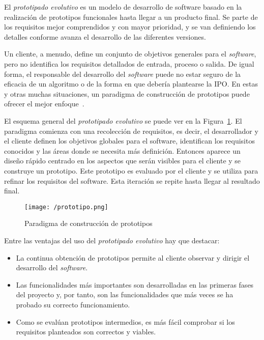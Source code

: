 El \emph{prototipado evolutivo} es un modelo de desarrollo de software basado en la realización de
prototipos funcionales hasta llegar a un producto final. Se parte de los requisitos mejor
comprendidos y con mayor prioridad, y se van definiendo los detalles conforme avanza el desarrollo
de las diferentes versiones.

Un cliente, a menudo, define un conjunto de objetivos generales para el \emph{software}, pero no
identifica los requisitos detallados de entrada, proceso o salida. De igual forma, el responsable
del desarrollo del \emph{software} puede no estar seguro de la eficacia de un algoritmo o de la
forma en que debería plantearse la \acs{IPO}. En estas y otras muchas situaciones, un paradigma de
construcción de prototipos puede ofrecer el mejor enfoque~\cite{Pressman10}.

El esquema general del \emph{prototipado evolutivo} se puede ver en la
Figura~\ref{fig:prototipo}. El paradigma comienza con una recolección de requisitos, es decir, el
desarrollador y el cliente definen los objetivos globales para el software, identifican los
requisitos conocidos y las áreas donde se necesita más definición. Entonces aparece un diseño rápido
centrado en los aspectos que serán visibles para el cliente y se construye un prototipo. Este
prototipo es evaluado por el cliente y se utiliza para refinar los requisitos del software. Esta
iteración se repite hasta llegar al resultado final.

\begin{figure}[!h]
  \begin{center}
    \texttt{[image: /prototipo.png]}
    \caption{Paradigma de construcción de prototipos}
    \label{fig:prototipo}
  \end{center}
\end{figure}

Entre las ventajas del uso del \emph{prototipado evolutivo} hay que destacar:

\begin{itemize}
  \item La continua obtención de prototipos permite al cliente observar y dirigir el desarrollo del
    \emph{software}.
  \item Las funcionalidades más importantes son desarrolladas en las primeras fases del proyecto y,
    por tanto, son las funcionalidades que más veces se ha probado su correcto funcionamiento.
  \item Como se evalúan prototipos intermedios, es más fácil comprobar si los requisitos planteados
    son correctos y viables.
\end{itemize}

